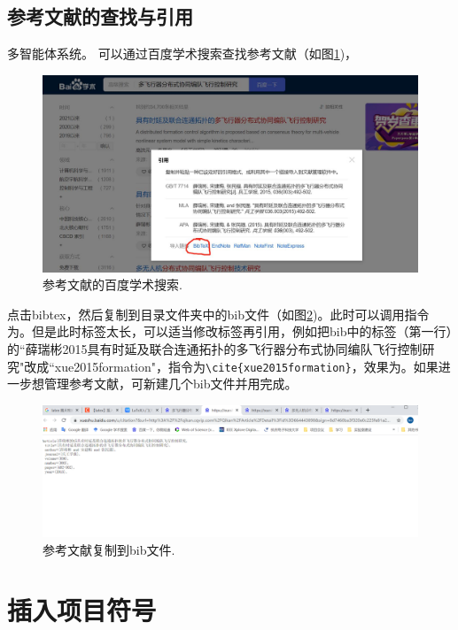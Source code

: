 \subsection{参考文献的查找与引用}


多智能体系统\citep{cao2011formation}。
可以通过百度学术搜索查找参考文献（如图\ref{fig_search0})，
 \begin{figure}[!htb]
  \centering
  \includegraphics[width=1\textwidth]{manual/figures/文献搜索说明0}
  \caption{参考文献的百度学术搜索.}
  \label{fig_search0}
\end{figure}
点击bibtex，然后复制到目录文件夹中的bib文件（如图\ref{fig_search1})。此时可以调用指令为\citep{薛瑞彬2015具有时延及联合连通拓扑的多飞行器分布式协同编队飞行控制研究}。但是此时标签太长，可以适当修改标签再引用，例如把bib中的标签（第一行）的``薛瑞彬2015具有时延及联合连通拓扑的多飞行器分布式协同编队飞行控制研究"改成``xue2015formation"，指令为\verb+\cite{xue2015formation}+，效果为\cite{xue2015formation}。如果进一步想管理参考文献，可新建几个bib文件并用\verb++完成。
 \begin{figure}[!htb]
  \centering
  \includegraphics[width=1\textwidth]{manual/figures/文献搜索说明1}
  \caption{参考文献复制到bib文件.}
  \label{fig_search1}
\end{figure}



\section{插入项目符号}

